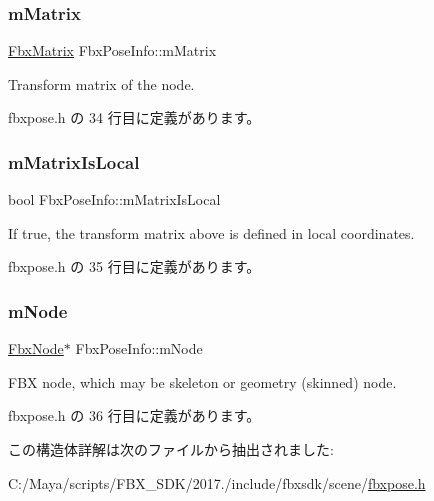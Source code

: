 \subsubsection{\texorpdfstring{m\+Matrix}{mMatrix}}
{\footnotesize\ttfamily \hyperlink{class_fbx_matrix}{Fbx\+Matrix} Fbx\+Pose\+Info\+::m\+Matrix}



Transform matrix of the node. 



 fbxpose.\+h の 34 行目に定義があります。

\mbox{\label{struct_fbx_pose_info_a8da52035b7e08cafc70aa419111c7142}} 
\subsubsection{\texorpdfstring{m\+Matrix\+Is\+Local}{mMatrixIsLocal}}
{\footnotesize\ttfamily bool Fbx\+Pose\+Info\+::m\+Matrix\+Is\+Local}



If true, the transform matrix above is defined in local coordinates. 



 fbxpose.\+h の 35 行目に定義があります。

\mbox{\label{struct_fbx_pose_info_a06e5aa4a4b65795d0a0bd87e4c79c74c}} 
\subsubsection{\texorpdfstring{m\+Node}{mNode}}
{\footnotesize\ttfamily \hyperlink{class_fbx_node}{Fbx\+Node}$\ast$ Fbx\+Pose\+Info\+::m\+Node}



F\+BX node, which may be skeleton or geometry (skinned) node. 



 fbxpose.\+h の 36 行目に定義があります。



この構造体詳解は次のファイルから抽出されました\+:\begin{DoxyCompactItemize}
\item 
C\+:/\+Maya/scripts/\+F\+B\+X\+\_\+\+S\+D\+K/2017./include/fbxsdk/scene/\hyperlink{fbxpose_8h}{fbxpose.\+h}\end{DoxyCompactItemize}
